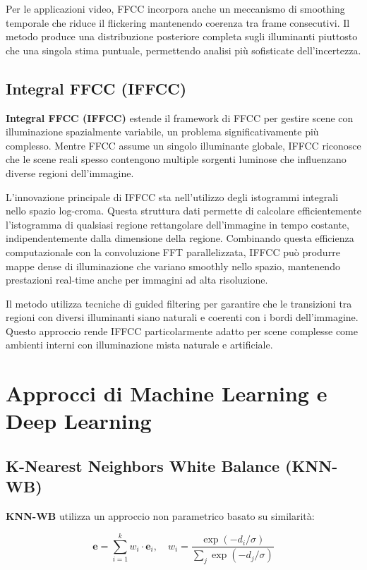 Per le applicazioni video, FFCC incorpora anche un meccanismo di smoothing temporale che riduce il flickering mantenendo coerenza tra frame consecutivi. Il metodo produce una distribuzione posteriore completa sugli illuminanti piuttosto che una singola stima puntuale, permettendo analisi più sofisticate dell'incertezza.

\subsection{Integral FFCC (IFFCC)}

\textbf{Integral FFCC (IFFCC)} \cite{wei_integral_2025} estende il framework di FFCC per gestire scene con illuminazione spazialmente variabile, un problema significativamente più complesso. Mentre FFCC assume un singolo illuminante globale, IFFCC riconosce che le scene reali spesso contengono multiple sorgenti luminose che influenzano diverse regioni dell'immagine.

L'innovazione principale di IFFCC sta nell'utilizzo degli istogrammi integrali nello spazio log-croma. Questa struttura dati permette di calcolare efficientemente l'istogramma di qualsiasi regione rettangolare dell'immagine in tempo costante, indipendentemente dalla dimensione della regione. Combinando questa efficienza computazionale con la convoluzione FFT parallelizzata, IFFCC può produrre mappe dense di illuminazione che variano smoothly nello spazio, mantenendo prestazioni real-time anche per immagini ad alta risoluzione.

Il metodo utilizza tecniche di guided filtering per garantire che le transizioni tra regioni con diversi illuminanti siano naturali e coerenti con i bordi dell'immagine. Questo approccio rende IFFCC particolarmente adatto per scene complesse come ambienti interni con illuminazione mista naturale e artificiale.

\section{Approcci di Machine Learning e Deep Learning}

\subsection{K-Nearest Neighbors White Balance (KNN-WB)}

\textbf{KNN-WB} \cite{afifi_deep_2020} utilizza un approccio non parametrico basato su similarità:

\begin{equation}
\mathbf{e} = \sum_{i=1}^{k} w_i \cdot \mathbf{e}_i, \quad w_i = \frac{\exp(-d_i/\sigma)}{\sum_j \exp(-d_j/\sigma)}
\end{equation}

